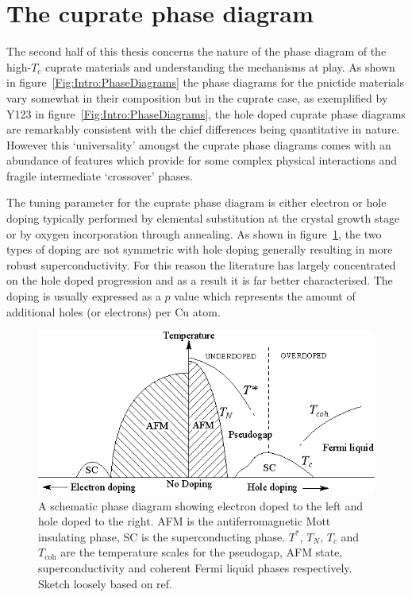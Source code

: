 
\section{The cuprate phase diagram}
    \label{Sec:Intro:PhaseDiagram}

The second half of this thesis concerns the nature of the phase diagram of the high-$T_c$ cuprate materials and understanding the mechanisms at play. As shown in figure~\ref{Fig:Intro:PhaseDiagrams} the phase diagrams for the pnictide materials vary somewhat in their composition but in the cuprate case, as exemplified by \ac{Y123} in figure~\ref{Fig:Intro:PhaseDiagrams}, the hole doped cuprate phase diagrams are remarkably consistent with the chief differences being quantitative in nature. However this `universality' amongst the cuprate phase diagrams comes with an abundance of features which provide for some complex physical interactions and fragile intermediate `crossover' phases. 

The tuning parameter for the cuprate phase diagram is either electron or hole doping typically performed by elemental substitution at the crystal growth stage or by oxygen incorporation through annealing. As shown in figure~\ref{Fig:Intro:ElecHolePhaseDiagram}, the two types of doping are not symmetric with hole doping generally resulting in more robust superconductivity. For this reason the literature has largely concentrated on the hole doped progression and as a result it is far better characterised. The doping is usually expressed as a $p$ value which represents the amount of additional holes (or electrons) per Cu atom.
\begin{figure}[htbp]
    \begin{center}
        \includegraphics[scale=1.4]{Chapter-Introduction/Figures/ElecHolePhaseDiagram/ElecHolePhaseDiagram}
        \caption{A schematic phase diagram showing electron doped to the left and hole doped to the right. \ac{AFM} is the antiferromagnetic Mott insulating phase, SC is the superconducting phase. $T^*$, $T_N$, $T_c$ and $T_{\textrm{coh}}$ are the temperature scales for the pseudogap, \ac{AFM} state, superconductivity and coherent Fermi liquid phases respectively. Sketch loosely based on ref.~\cite{Orenstein2010}}
        \label{Fig:Intro:ElecHolePhaseDiagram}
    \end{center}
\end{figure}

